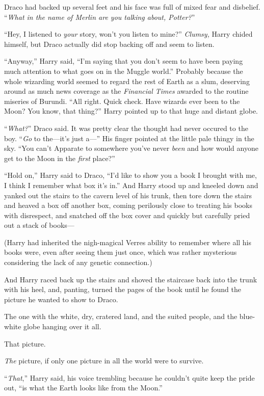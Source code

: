 Draco had backed up several feet and his face was full of mixed fear and disbelief. “\emph{What in the name of Merlin are you talking about, Potter?}”

“Hey, I listened to \emph{your} story, won’t you listen to mine?” \emph{Clumsy,} Harry chided himself, but Draco actually did stop backing off and seem to listen.

“Anyway,” Harry said, “I’m saying that you don’t seem to have been paying much attention to what goes on in the Muggle world.” Probably because the whole wizarding world seemed to regard the rest of Earth as a slum, deserving around as much news coverage as the \emph{Financial Times} awarded to the routine miseries of Burundi. “All right. Quick check. Have wizards ever been to the Moon? You know, that thing?” Harry pointed up to that huge and distant globe.

“\emph{What?}” Draco said. It was pretty clear the thought had never occured to the boy. “\emph{Go} to the—it’s just a—” His finger pointed at the little pale thingy in the sky. “You can’t Apparate to somewhere you’ve never \emph{been} and how would anyone get to the Moon in the \emph{first} place?”

“Hold on,” Harry said to Draco, “I’d like to show you a book I brought with me, I think I remember what box it’s in.” And Harry stood up and kneeled down and yanked out the stairs to the cavern level of his trunk, then tore down the stairs and heaved a box off another box, coming perilously close to treating his books with disrespect, and snatched off the box cover and quickly but carefully pried out a stack of books—

(Harry had inherited the nigh-magical Verres ability to remember where all his books were, even after seeing them just once, which was rather mysterious considering the lack of any genetic connection.)

And Harry raced back up the stairs and shoved the staircase back into the trunk with his heel, and, panting, turned the pages of the book until he found the picture he wanted to show to Draco.

The one with the white, dry, cratered land, and the suited people, and the blue-white globe hanging over it all.

That picture.

\emph{The} picture, if only one picture in all the world were to survive.

“\emph{That},” Harry said, his voice trembling because he couldn’t quite keep the pride out, “is what the Earth looks like from the Moon.”

